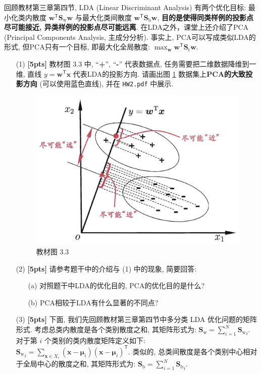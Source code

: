 \documentclass[a4paper]{article}
\numberwithin{equation}{section}
\theoremstyle{definition}
\def \transposed {\mathsf{T}}
\def \muBold {\bm{\mu}}
\def \Sw {\mathbf{S}_{\operatorname{w}}}
\def \Sb {\mathbf{S}_{\operatorname{b}}}
\def \St {\mathbf{S}_{\operatorname{t}}}
\def \w {\bm{w}}
\def \x {\bm{x}}
\begin{document}
回顾教材第三章第四节, LDA (Linear Discriminant Analysis) 有两个优化目标: 最小化类内散度 $\w^\transposed \Sw \w$ 与最大化类间散度 $\w^\transposed \Sb \w$, \textbf{目的是使得同类样例的投影点尽可能接近, 异类样例的投影点尽可能远离}. 在LDA之外，课堂上还介绍了PCA (Principal Components Analysis, 主成分分析). 事实上, PCA可以写成类似LDA的形式, 但PCA只有一个目标, 即最大化全局散度: $\max_{\w} \w^\transposed \St \w$.

\begin{enumerate}
    \item[(1)] \textbf{[5pts]} 教材图 3.3 中, ``\textbf{+}'', ``\textbf{-}'' 代表数据点, 任务需要把二维数据降维到一维, 直线 $y = \w^\transposed \x$ 代表LDA的投影方向. 请画出图 \ref{textbook_fig_3_3} 数据集上\textbf{PCA的大致投影方向} (可以使用蓝色直线), 并在 \texttt{HW2.pdf} 中展示.
          \begin{figure}[htbp]
              \centering
              \includegraphics[width=0.5\linewidth]{textbook-fig3.3.jpg}
              \caption{教材图 3.3}
              \label{textbook_fig_3_3}
          \end{figure}
    \item[(2)] \textbf{[5pts]} 请参考题干中的介绍与 (1) 中的现象, 简要回答:
          \begin{itemize}
              \item [(a)] 对照题干中LDA的优化目的, PCA的优化目的是什么?
              \item [(b)] PCA相较于LDA有什么显著的不同点?
          \end{itemize}
    \item[(3)] \textbf{[5pts]} \textsf{下面, 我们先回顾教材第三章第四节中多分类 LDA 优化问题的矩阵形式. 考虑总类内散度是各个类别散度之和, 其矩阵形式为:
              $\Sw = \sum_{i=1}^{N} {\Sw}_i.$
              对于第 $i$ 个类别的类内散度矩阵定义如下:
              ${\Sw}_i = \sum_{\x \in X_i} (\x - \muBold_i) (\x - \muBold_i)^\transposed.$
              类似的, 总类间散度是各个类别中心相对于全局中心的散度之和, 其矩阵形式为:
              $\Sb = \sum_{i=1}^{N} {\Sb}_i.$
}
\end{enumerate}
\end{document}
